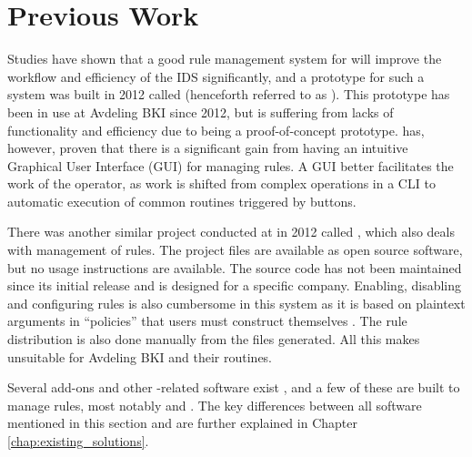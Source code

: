 \section{Previous Work}
Studies \cite{BHTB} have shown that a good rule management system for \snort{}
will improve the workflow and efficiency of the IDS significantly, and a
prototype for such a system was built in 2012 called \bringhome{} \cite{BHTB}
(henceforth referred to as \bhtb{}). This prototype has been in use at Avdeling
BKI since 2012, but is suffering from lacks of functionality and efficiency due
to being a proof-of-concept prototype. \bhtb{} has, however, proven that
there is a significant gain from having an intuitive Graphical User Interface
(GUI) for managing rules. A GUI better facilitates the work of the operator, as
work is shifted from complex operations in a CLI to automatic execution of common
routines triggered by buttons.

There was another similar project conducted at \GUC{} in 2012 called
\snortmanager{} \cite{SnortManager}, which also deals with management of
\snort{} rules. The \snortmanager{} project files are available as open source
software, but no usage instructions are available.
The source code has not been maintained since its initial release and is designed for a specific company. Enabling,
disabling and configuring rules is also cumbersome in this system as it is
based on plaintext arguments in ``policies'' that users must construct
themselves \cite{SnortManager}. The rule distribution is also done manually from the
files generated. All this makes \snortmanager{} unsuitable for Avdeling BKI and
their routines.

Several add-ons and other \snort-related software
exist \cite{snort_additional_downloads}, and
a few of these are built to manage \snort{} rules, most notably
\pulledpork{} \cite{pulledpork} and
\oinkmaster{} \cite{oinkmaster}. The key differences
between all software mentioned in this section and \snowman{} are further
explained in Chapter \ref{chap:existing_solutions}.
